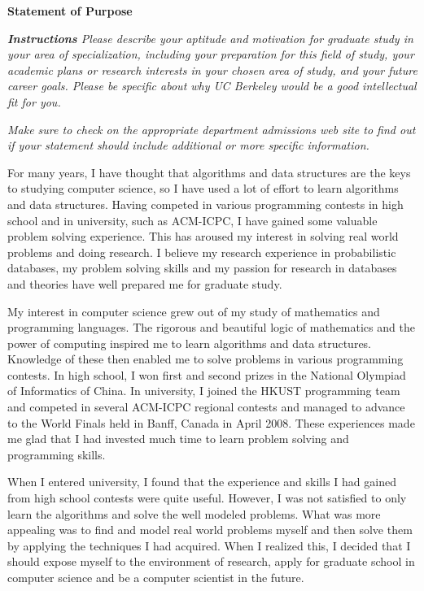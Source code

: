 \documentclass[10pt]{report}
\begin{document}
\begin{center}
\textbf{\large Statement of Purpose}
\end{center}

\textsl{\textbf{Instructions} Please describe your aptitude and motivation for graduate study in your area of specialization, including your preparation for this field of study, your academic plans or research interests in your chosen area of study, and your future career goals. Please be specific about why UC Berkeley would be a good intellectual fit for you.}


\textsl{Make sure to check on the appropriate department admissions web site to find out if your statement should include additional or more specific information.} 

\vspace{0.2cm}
For many years, I have thought that algorithms and data structures are the keys to studying computer science, so I have used a lot of effort to learn algorithms and data structures. Having competed in various programming contests in high school and in university, such as ACM-ICPC, I have gained some valuable problem solving experience. This has aroused my interest in solving real world problems and doing research. I believe my research experience in probabilistic databases, my problem solving skills and my passion for research in databases and theories have well prepared me for graduate study. 

\vspace{0.2cm}
My interest in computer science grew out of my study of mathematics and programming languages. The rigorous and beautiful logic of mathematics and the power of computing inspired me to learn algorithms and data structures. Knowledge of these then enabled me to solve problems in various programming contests. In high school, I won first and second prizes in the National Olympiad of Informatics of China. In university, I joined the HKUST programming team and competed in several ACM-ICPC regional contests and managed to advance to the World Finals held in Banff, Canada in April 2008. These experiences made me glad that I had invested much time to learn problem solving and programming skills.

\vspace{0.2cm}
When I entered university, I found that the experience and skills I had gained from high school contests were quite useful. However, I was not satisfied to only learn the algorithms and solve the well modeled problems. What was more appealing was to find and model real world problems myself and then solve them by applying the techniques I had acquired. When I realized this, I decided that I should expose myself to the environment of research, apply for graduate school in computer science and be a computer scientist in the future.
\end{document}
